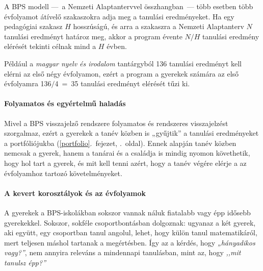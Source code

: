 A BPS modell ---~a Nemzeti Alaptantervvel összhangban~--- több esetben
több évfolyamot átívelő szakaszokra adja meg a tanulási eredményeket. Ha
egy pedagógiai szakasz $H$ hosszúságú, és arra a szakaszra a Nemzeti
Alaptanterv $N$ tanulási eredményt határoz meg, akkor a program évente
$N/H$ tanulási eredmény elérését tekinti célnak mind a
$H$ évben.

Például a \emph{magyar nyelv és irodalom} tantárgyból 136 tanulási
eredményt kell elérni az első négy évfolyamon, ezért a program a
gyerekek számára az első évfolyamra 136$/$4~=~35 tanulási eredményt
elérését tűzi ki.

\hypertarget{folyamatos-es-egyertelmu-haladas}{%
\paragraph{Folyamatos és egyértelmű
haladás}\label{folyamatos-es-egyertelmu-haladas}}

Mivel a BPS visszajelző rendszere folyamatos és rendszeres visszajelzést
szorgalmaz, ezért a gyerekek a tanév közben is „gyűjtik'' a tanulási
eredményeket a
portfóliójukba (\ref{portfolio}.~fejezet, \pageref{portfolio}.~oldal).
Ennek alapján tanév közben nemcsak a gyerek, hanem a tanárai és a családja is
mindig nyomon követhetik, hogy hol tart a gyerek, és mit kell tenni azért,
hogy a tanév végére elérje a az évfolyamhoz tartozó követelményeket.

\hypertarget{kevert-korosztaly-es-az-evfolyamok}{%
\paragraph{A kevert korosztályok és az
évfolyamok}\label{kevert-korosztaly-es-az-evfolyamok}}

A gyerekek a BPS-iskolákban sokszor vannak náluk fiatalabb vagy épp
idősebb gyerekekkel. Sokszor, sokféle csoportbontásban dolgoznak:
ugyanaz a két gyerek, aki együtt, egy csoportban tanul angolul,
lehet, hogy külön tanul matematikáról, mert teljesen máshol tartanak
a megértésben. Így az a kérdés, hogy \emph{„hányadikos vagy?''}, nem
annyira releváns a mindennapi tanulásban, mint az, hogy \emph{,,mit tanulsz épp?''}

